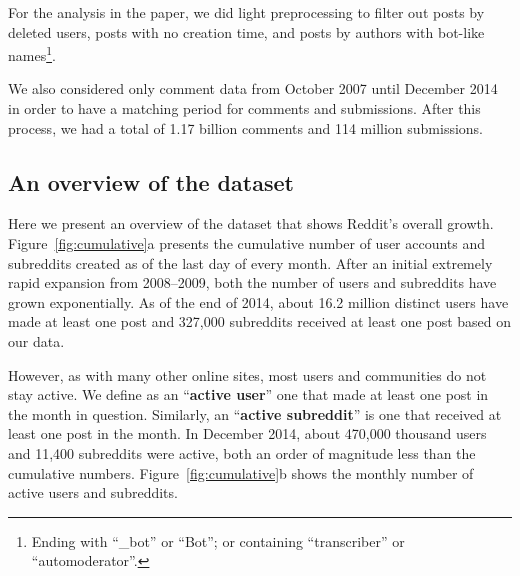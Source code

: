 For the analysis in the paper, we did light preprocessing to filter out posts by deleted users, posts with no creation time, and posts by authors with
bot-like names\footnote{Ending with ``\_bot'' or ``Bot''; or containing ``transcriber'' or ``automoderator''.}.

We also considered only comment data from October 2007 until December 2014 in order to have a matching period for comments and submissions. After this process, we had a total of 1.17 billion comments and 114 million submissions.

\begin{figure*}[!tb]
\centering
{}
\caption{Figure (a) shows the cumulative growth of Reddit for users and subreddits. Figure (b) shows the number of active users and subreddits in Reddit over time. An active user or subreddit is one that had at least one post (comment or submission) in the time bin we used---here, discretized by month.}
\label{fig:cumulative}
\end{figure*}

\subsection{An overview of the dataset}

Here we present an overview of the dataset that shows Reddit's overall growth.  Figure~\ref{fig:cumulative}a presents the cumulative number of user accounts and subreddits created as of the last day of every month. After an initial extremely rapid expansion from 2008--2009, both the number of users and subreddits have grown exponentially.  As of the end of 2014, about 16.2 million distinct users have made at least one post and 327,000 subreddits received at least one post based on our data.

However, as with many other online sites, most users \cite{Scellato2011,Hughes2009,Java2007} and communities \cite{Arguello2006} do not stay active. We define as an ``\textbf{active user}'' one that made at least one post in the month in question. Similarly, an ``\textbf{active subreddit}'' is one that received at least one post in the month. In December 2014, about 470,000 thousand users and 11,400 subreddits were active, both an order of magnitude less than the cumulative numbers. Figure~\ref{fig:cumulative}b shows the monthly number of active users and subreddits.

